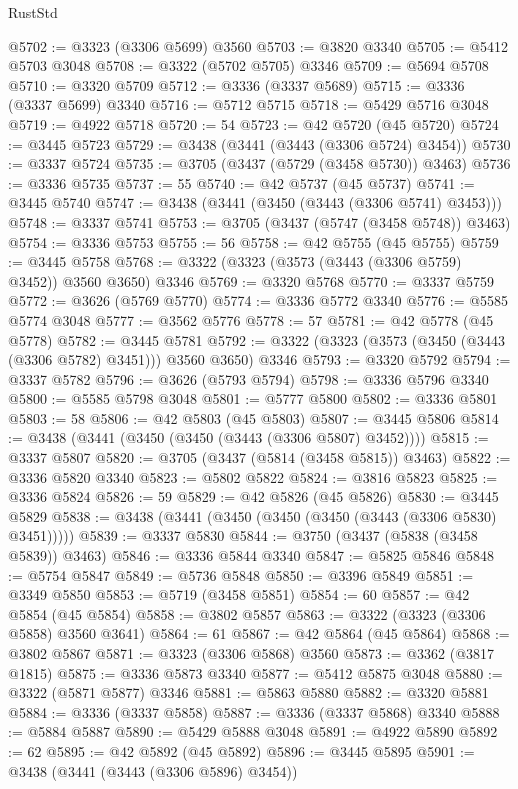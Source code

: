 \begin{lexlean}{RustStd}
\begin{coremodule}
@5702 := @3323 (@3306 @5699) @3560
@5703 := @3820 @3340
@5705 := @5412 @5703 @3048
@5708 := @3322 (@5702 @5705) @3346
@5709 := @5694 @5708
@5710 := @3320 @5709
@5712 := @3336 (@3337 @5689)
@5715 := @3336 (@3337 @5699) @3340
@5716 := @5712 @5715
@5718 := @5429 @5716 @3048
@5719 := @4922 @5718
@5720 := 54
@5723 := @42 @5720 (@45 @5720)
@5724 := @3445 @5723
@5729 := @3438 (@3441 (@3443 (@3306 @5724) @3454))
@5730 := @3337 @5724
@5735 := @3705 (@3437 (@5729 (@3458 @5730)) @3463)
@5736 := @3336 @5735
@5737 := 55
@5740 := @42 @5737 (@45 @5737)
@5741 := @3445 @5740
@5747 := @3438 (@3441 (@3450 (@3443 (@3306 @5741) @3453)))
@5748 := @3337 @5741
@5753 := @3705 (@3437 (@5747 (@3458 @5748)) @3463)
@5754 := @3336 @5753
@5755 := 56
@5758 := @42 @5755 (@45 @5755)
@5759 := @3445 @5758
@5768 := @3322 (@3323 (@3573 (@3443 (@3306 @5759) @3452)) @3560 @3650) @3346
@5769 := @3320 @5768
@5770 := @3337 @5759
@5772 := @3626 (@5769 @5770)
@5774 := @3336 @5772 @3340
@5776 := @5585 @5774 @3048
@5777 := @3562 @5776
@5778 := 57
@5781 := @42 @5778 (@45 @5778)
@5782 := @3445 @5781
@5792 := @3322 (@3323 (@3573 (@3450 (@3443 (@3306 @5782) @3451))) @3560 @3650) @3346
@5793 := @3320 @5792
@5794 := @3337 @5782
@5796 := @3626 (@5793 @5794)
@5798 := @3336 @5796 @3340
@5800 := @5585 @5798 @3048
@5801 := @5777 @5800
@5802 := @3336 @5801
@5803 := 58
@5806 := @42 @5803 (@45 @5803)
@5807 := @3445 @5806
@5814 := @3438 (@3441 (@3450 (@3450 (@3443 (@3306 @5807) @3452))))
@5815 := @3337 @5807
@5820 := @3705 (@3437 (@5814 (@3458 @5815)) @3463)
@5822 := @3336 @5820 @3340
@5823 := @5802 @5822
@5824 := @3816 @5823
@5825 := @3336 @5824
@5826 := 59
@5829 := @42 @5826 (@45 @5826)
@5830 := @3445 @5829
@5838 := @3438 (@3441 (@3450 (@3450 (@3450 (@3443 (@3306 @5830) @3451)))))
@5839 := @3337 @5830
@5844 := @3750 (@3437 (@5838 (@3458 @5839)) @3463)
@5846 := @3336 @5844 @3340
@5847 := @5825 @5846
@5848 := @5754 @5847
@5849 := @5736 @5848
@5850 := @3396 @5849
@5851 := @3349 @5850
@5853 := @5719 (@3458 @5851)
@5854 := 60
@5857 := @42 @5854 (@45 @5854)
@5858 := @3802 @5857
@5863 := @3322 (@3323 (@3306 @5858) @3560 @3641)
@5864 := 61
@5867 := @42 @5864 (@45 @5864)
@5868 := @3802 @5867
@5871 := @3323 (@3306 @5868) @3560
@5873 := @3362 (@3817 @1815)
@5875 := @3336 @5873 @3340
@5877 := @5412 @5875 @3048
@5880 := @3322 (@5871 @5877) @3346
@5881 := @5863 @5880
@5882 := @3320 @5881
@5884 := @3336 (@3337 @5858)
@5887 := @3336 (@3337 @5868) @3340
@5888 := @5884 @5887
@5890 := @5429 @5888 @3048
@5891 := @4922 @5890
@5892 := 62
@5895 := @42 @5892 (@45 @5892)
@5896 := @3445 @5895
@5901 := @3438 (@3441 (@3443 (@3306 @5896) @3454))

\end{coremodule}
\end{lexlean}
